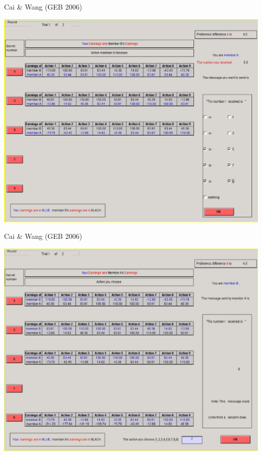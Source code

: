 \documentclass{beamer}
\begin{document}
\begin{frame}{Cai \& Wang (GEB 2006)}
\begin{card}
\centering 
\includegraphics[height=0.65\textheight]{./i/cw2004fig1.eps}
\end{card}
\end{frame}

\begin{frame}{Cai \& Wang (GEB 2006)}
\begin{card}
\centering 
\includegraphics[height=0.65\textheight]{./i/cw2004fig2.eps}
\end{card}
\end{frame}
\end{document}
